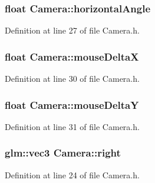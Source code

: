 \subsubsection[{horizontal\+Angle}]{\setlength{\rightskip}{0pt plus 5cm}float Camera\+::horizontal\+Angle\hspace{0.3cm}{\ttfamily [private]}}\label{class_camera_aad9d573147be409e929251eca0bea339}


Definition at line 27 of file Camera.\+h.

\hypertarget{class_camera_a38f42e9b04d2180f267af1bdd5b87216}{}
\subsubsection[{mouse\+Delta\+X}]{\setlength{\rightskip}{0pt plus 5cm}float Camera\+::mouse\+Delta\+X\hspace{0.3cm}{\ttfamily [private]}}\label{class_camera_a38f42e9b04d2180f267af1bdd5b87216}


Definition at line 30 of file Camera.\+h.

\hypertarget{class_camera_a65944911597dcfb60e21300ed8c62305}{}
\subsubsection[{mouse\+Delta\+Y}]{\setlength{\rightskip}{0pt plus 5cm}float Camera\+::mouse\+Delta\+Y\hspace{0.3cm}{\ttfamily [private]}}\label{class_camera_a65944911597dcfb60e21300ed8c62305}


Definition at line 31 of file Camera.\+h.

\hypertarget{class_camera_aebffcc6289dd99df7554b18d00a81161}{}
\subsubsection[{right}]{\setlength{\rightskip}{0pt plus 5cm}glm\+::vec3 Camera\+::right\hspace{0.3cm}{\ttfamily [private]}}\label{class_camera_aebffcc6289dd99df7554b18d00a81161}


Definition at line 24 of file Camera.\+h.

\hypertarget{class_camera_a3fe5f351380fb118ffc600591769f049}{}
